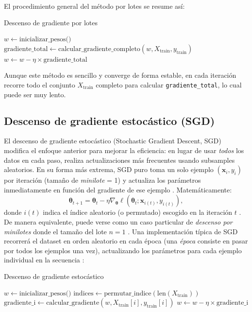 \documentclass[12pt, spanish]{article}
\begin{document}
El procedimiento general del método por lotes se resume así:

\begin{algorithm}[H]
\caption{Descenso de gradiente por lotes}
\begin{algorithmic}[1]
\State $w \gets \text{inicializar\_pesos()}$
    \State $\text{gradiente\_total} \gets \text{calcular\_gradiente\_completo}(w, X_{\text{train}}, y_{\text{train}})$
    \State $w \gets w - \eta \times \text{gradiente\_total}$ 
\EndFor
\end{algorithmic}
\end{algorithm}

Aunque este método es sencillo y converge de forma estable, en cada iteración recorre todo el conjunto $X_{\text{train}}$ completo para calcular \texttt{gradiente\_total}, lo cual puede ser muy lento.

\subsection{Descenso de gradiente estocástico (SGD)}
El descenso de gradiente estocástico (Stochastic Gradient Descent, SGD) modifica el enfoque anterior para mejorar la eficiencia: en lugar de usar \textit{todos} los datos en cada paso, realiza actualizaciones más frecuentes usando subsamples aleatorios. En su forma más extrema, SGD puro toma un solo ejemplo $(\mathbf{x}_i, y_i)$ por iteración (tamaño de \textit{minilote} = 1) y actualiza los parámetros inmediatamente en función del gradiente de ese ejemplo \cite{ref1}. Matemáticamente:
\[
\boldsymbol{\theta}_{t+1} = \boldsymbol{\theta}_t - \eta \nabla_{\boldsymbol{\theta}} \ell(\boldsymbol{\theta}_t; \mathbf{x}_{i(t)}, y_{i(t)}),
\]
donde $i(t)$ indica el índice aleatorio (o permutado) escogido en la iteración $t$ \cite{ref1}. De manera equivalente, puede verse como un caso particular de \textit{descenso por minilotes} donde el tamaño del lote $n=1$ \cite{ref1}. Una implementación típica de SGD recorrerá el dataset en orden aleatorio en cada época (una \textit{época} consiste en pasar por todos los ejemplos una vez), actualizando los parámetros para cada ejemplo individual en la secuencia \cite{ref1}:

\begin{algorithm}[H]
\caption{Descenso de gradiente estocástico}
\begin{algorithmic}[1]
\State $w \gets \text{inicializar\_pesos()}$
    \State $\text{indices} \gets \text{permutar\_indice}(\text{len}(X_{\text{train}}))$
        \State $\text{gradiente\_i} \gets \text{calcular\_gradiente}(w, X_{\text{train}}[i], y_{\text{train}}[i])$
        \State $w \gets w - \eta \times \text{gradiente\_i}$ 
    \EndFor
\EndFor
\end{algorithmic}
\end{algorithm}
\end{document}
